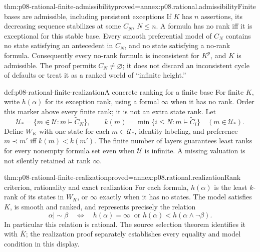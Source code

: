 \begin{hbtheorem}{thm:p08-rational-finite-admissibility}{proved=annex:p08.rational.admissibility}{Finite bases are admissible, including persistent exceptions}
If \(K\) has \(n\) assertions, its decreasing sequence stabilizes
at some \(C_N\), \(N\leq n\). A formula has no rank iff it is
exceptional for this stable base. Every smooth preferential model of
\(C_N\) contains no state satisfying an antecedent in \(C_N\),
and no state satisfying a no-rank formula. Consequently every no-rank
formula is inconsistent for \(K^p\), and \(K\) is admissible.
The proof permits \(C_N\ne\varnothing\); it does not discard an
inconsistent cycle of defaults or treat it as a ranked world of
``infinite height.''
\end{hbtheorem}

\begin{hbdefinition}{def:p08-rational-finite-realization}{A concrete ranking for a finite base}
For finite \(K\), write \(h(\alpha)\) for its exception rank,
using a formal \(\infty\) when it has no rank. Order this marker
above every finite rank; it is not an extra state rank.
Let
\[
 \mathcal U_* =\{m\in\mathcal U:m\models\widetilde C_N\},\qquad
 k(m)=\min\{i\leq N:m\models\widetilde C_i\}\quad(m\in\mathcal U_*).
\]
Define \(W_K\) with one state for each \(m\in\mathcal U_*\),
identity labeling, and preference \(m\prec m'\) iff \(k(m)<k(m')\).
The finite number of layers guarantees least ranks for every nonempty
formula set even when \(\mathcal U\) is infinite. A missing valuation
is not silently retained at rank \(\infty\).
\end{hbdefinition}



\begin{hbtheorem}{thm:p08-rational-finite-realization}{proved=annex:p08.rational.realization}{Rank criterion, rationality and exact realization}
For each formula, \(h(\alpha)\) is the least \(k\)-rank of its
states in \(W_K\), or \(\infty\) exactly when it has no states.
The model satisfies \(K\), is smooth and ranked, and represents
precisely the relation
\[
 \alpha\mathrel{|\!\sim}\beta
 \quad\Longleftrightarrow\quad
 h(\alpha)=\infty\ \text{ or }
 h(\alpha)<h(\alpha\wedge\neg\beta).
\]
In particular this relation is rational. The source selection theorem
identifies it with \(\overline K\); the realization proof separately
establishes every equality and model condition in this display.
\end{hbtheorem}

